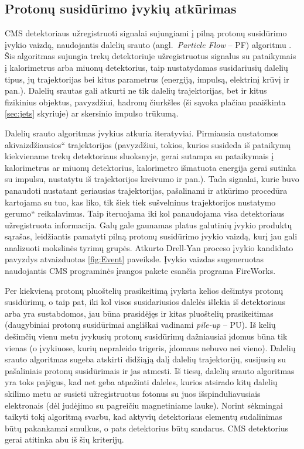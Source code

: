 \documentclass[a4paper, 12pt, oneside]{article}
\newcommand{\ltq}[1]{{\quotedblbase{}#1\textquotedblleft{}}}
\newlength\q
\begin{document}
\subsection{Protonų susidūrimo įvykių atkūrimas}
CMS detektoriaus užregistruoti signalai sujungiami į pilną protonų susidūrimo įvykio vaizdą, naudojantis
dalelių srauto (angl.\ \textit{Particle Flow} -- PF) algoritmu \cite{ParticleFlow}.
Šis algoritmas sujungia trekų detektoriuje užregistruotus signalus su pataikymais į kalorimetrus arba miuonų
detektorius, taip nustatydamas susidariusių dalelių tipus, jų trajektorijas bei kitus parametrus
(energiją, impulsą, elektrinį krūvį ir pan.).
Dalelių srautas gali atkurti ne tik dalelių trajektorijas, bet ir kitus fizikinius objektus, pavyzdžiui,
hadronų čiurkšles (ši sąvoka plačiau paaiškinta \ref{sec:jets} skyriuje) ar skersinio impulso trūkumą.

Dalelių srauto algoritmas įvykius atkuria iteratyviai.
Pirmiausia nustatomos \ltq{akivaizdžiausios} trajektorijos (pavyzdžiui, tokios, kurios susideda iš pataikymų
kiekviename trekų detektoriaus sluoksnyje, gerai sutampa su pataikymais į kalorimetrus ar miuonų detektorius,
kalorimetro išmatuota energija gerai sutinka su impulsu, nustatytu iš trajektorijos kreivumo ir pan.).
Tada signalai, kurie buvo panaudoti nustatant geriausias trajektorijas, pašalinami ir atkūrimo procedūra
kartojama su tuo, kas liko, tik šiek tiek sušvelninus trajektorijos nustatymo \ltq{gerumo} reikalavimus.
Taip iteruojama iki kol panaudojama visa detektoriaus užregistruota informacija.
Galų gale gaunamas platus galutinių įvykio produktų sąrašas, leidžiantis pamatyti pilną protonų susidūrimo įvykio vaizdą,
kurį jau gali analizuoti mokslinės tyrimų grupės.
Atkurto Drell-Yan proceso įvykio kandidato pavyzdys atvaizduotas \ref{fig:Event} paveiksle.
Įvykio vaizdas sugeneruotas naudojantis CMS programinės įrangos pakete esančia programa FireWorks.

Per kiekvieną protonų pluoštelių prasikeitimą įvyksta kelios dešimtys protonų susidūrimų, o taip pat, iki kol
visos susidariusios dalelės išlekia iš detektoriaus arba yra sustabdomos, jau būna prasidėjęs ir kitas pluoštelių
prasikeitimas (daugybiniai protonų susidūrimai angliškai vadinami \textit{pile-up} -- PU).
Iš kelių dešimčių vienu metu įvykusių protonų susidūrimų dažniausiai įdomus būna tik vienas (o įvykiuose, kurių
nepraleido trigeris, įdomaus nebuvo nei vieno).
Dalelių srauto algoritmas sugeba atskirti didžiąją dalį dalelių trajektorijų, susijusių su pašaliniais
protonų susidūrimais ir jas atmesti.
Iš tiesų, dalelių srauto algoritmas yra toks pajėgus, kad net geba atpažinti daleles, kurios atsirado kitų dalelių skilimo metu
ar susieti užregistruotus fotonus su juos išspinduliavusiais elektronais (dėl judėjimo su pagreičiu magnetiniame lauke).
Norint sėkmingai taikyti tokį algoritmą svarbu, kad aktyvių detektoriaus elementų sudalinimas būtų pakankamai smulkus,
o pats detektorius būtų sandarus.
CMS detektorius gerai atitinka abu iš šių kriterijų.
\end{document}
